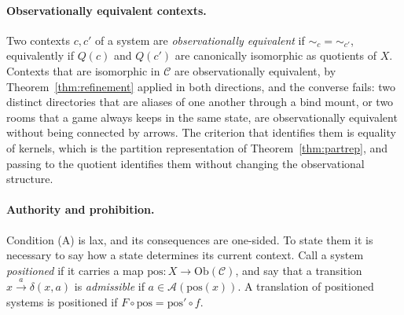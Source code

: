\documentclass[11pt]{article}
\theoremstyle{definition}
\theoremstyle{remark}
\newcommand{\cC}{\mathcal C}
\newcommand{\cA}{\mathcal A}
\newcommand{\Ob}{\mathrm{Ob}}
\newcommand{\sk}{\sim}
\begin{document}
\paragraph{Observationally equivalent contexts.} Two contexts $c,c'$ of a system are \emph{observationally equivalent} if ${\sk_c}={\sk_{c'}}$, equivalently if $Q(c)$ and $Q(c')$ are canonically isomorphic as quotients of $X$. Contexts that are isomorphic in $\cC$ are observationally equivalent, by Theorem~\ref{thm:refinement} applied in both directions, and the converse fails: two distinct directories that are aliases of one another through a bind mount, or two rooms that a game always keeps in the same state, are observationally equivalent without being connected by arrows. The criterion that identifies them is equality of kernels, which is the partition representation of Theorem~\ref{thm:partrep}, and passing to the quotient identifies them without changing the observational structure.

\paragraph{Authority and prohibition.} Condition (A) is lax, and its consequences are one-sided. To state them it is necessary to say how a state determines its current context. Call a system \emph{positioned} if it carries a map $\mathrm{pos}:X\to\Ob(\cC)$, and say that a transition $x\xrightarrow{a}\delta(x,a)$ is \emph{admissible} if $a\in\cA(\mathrm{pos}(x))$. A translation of positioned systems is positioned if $F\circ\mathrm{pos}=\mathrm{pos}'\circ f$.
\end{document}
